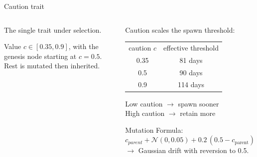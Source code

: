 {
  \setlength{\splitpos}{-0.55\paperwidth} %
  \rightfooterwhitetrue
  \begin{frame}{Caution trait}
    \begin{columns}[T]
      \begin{textcolumn}
        \large
        The single trait under selection.

        \medskip
        \medskip
        \medskip
        \medskip
        \medskip
        \medskip
        Value \(c \in [0.35, 0.9]\), with the genesis node starting at \(c = 0.5\).
        Rest is mutated then inherited.

      \end{textcolumn}
      \begin{textcolumn}
        \color{white}
          \footnotesize
        Caution scales the spawn threshold:

        \smallskip
        \begin{tabular}{cc}
          caution \(c\) & effective threshold \\
          0.35 & 81 days \\
          0.5  & 90 days \\
          0.9  & 114 days \\
        \end{tabular}

        \smallskip
        Low caution \(\to\) spawn sooner \\
        High caution \(\to\) retain more

        \smallskip
        Mutation Formula:\\
        \(c_{parent} + \mathcal{N}(0,0.05)
        + 0.2\,(0.5 - c_{\text{parent}})\) \(\to\) Gaussian drift with reversion to 0.5.
      \end{textcolumn}
    \end{columns}
  \end{frame}
}
\setlength{\splitpos}{0pt}\rightfooterwhitefalse %
